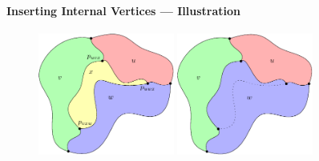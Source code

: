\documentclass[t,18pt]{beamer}
\newcommand{\emdash}{---}
\begin{document}
\begin{frame}[c]
  \frametitle{}
  \framesubtitle{Inserting Internal Vertices \emdash{} Illustration}
  \begin{figure}
    \includegraphics[height=4cm]{../Thesis/Resources/RemoveVertex-Illustration-1.pdf}
    \qquad
    \includegraphics[height=4cm]{../Thesis/Resources/RemoveVertex-Illustration-2.pdf}
  \end{figure}
\end{frame}
\end{document}
